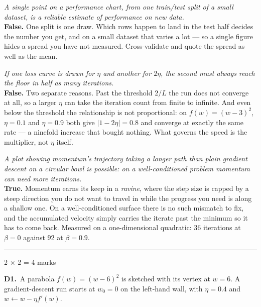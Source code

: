\documentclass[10pt,a4paper]{article}
\newcommand{\parthead}[2]{\vspace{2pt}\noindent\rule{\linewidth}{0.4pt}\par\vspace{2pt}%
  \noindent{\bfseries Part #1}\hfill{\small #2}\par\vspace{1pt}}
\begin{document}
\begin{sC}

  \item \emph{A single point on a performance chart, from one train/test split of a small dataset, is a reliable estimate of performance on new data.}\\[2pt] \textbf{False.} One split is one draw. Which rows happen to land in the test half decides the number you get, and on a small dataset that varies a lot --- so a single figure hides a spread you have not measured. Cross-validate and quote the spread as well as the mean.

  \item \emph{If one loss curve is drawn for $\eta$ and another for $2\eta$, the second must always reach the floor in half as many iterations.}\\[2pt] \textbf{False.} Two separate reasons. Past the threshold $2/L$ the run does not converge at all, so a larger $\eta$ can take the iteration count from finite to infinite. And even below the threshold the relationship is not proportional: on $f(w) = (w-3)^2$, $\eta = 0.1$ and $\eta = 0.9$ both give $\lvert 1 - 2\eta \rvert = 0.8$ and converge at exactly the same rate --- a ninefold increase that bought nothing. What governs the speed is the multiplier, not $\eta$ itself.

  \item \emph{A plot showing momentum's trajectory taking a longer path than plain gradient descent on a circular bowl is possible: on a well-conditioned problem momentum can need more iterations.}\\[2pt] \textbf{True.} Momentum earns its keep in a \emph{ravine}, where the step size is capped by a steep direction you do not want to travel in while the progress you need is along a shallow one. On a well-conditioned surface there is no such mismatch to fix, and the accumulated velocity simply carries the iterate past the minimum so it has to come back. Measured on a one-dimensional quadratic: $36$ iterations at $\beta = 0$ against $92$ at $\beta = 0.9$.

\end{sC}

\newpage

\parthead{D --- Short answer}{2 $\times$ 2 = 4 marks}

\textbf{D1.}\ A parabola $f(w) = (w-6)^2$ is sketched with its vertex at $w = 6$. A gradient-descent run starts at $w_0 = 0$ on the left-hand wall, with $\eta = 0.4$ and $w \leftarrow w - \eta f'(w)$.
\end{document}
